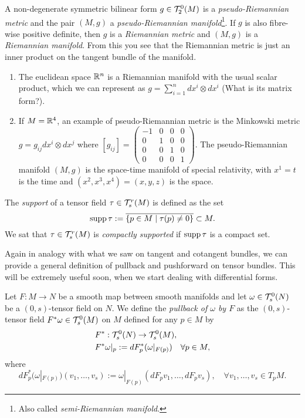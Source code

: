 \begin{example}
  A non-degenerate symmetric bilinear form $g\in \mathcal{T}_2^0(M)$ is a \emph{pseudo-Riemannian metric} and the pair $(M,g)$ a \emph{pseudo-Riemannian manifold}\footnote{Also called \emph{semi-Riemannian manifold}.}.
  If $g$ is also fibre-wise positive definite, then $g$ is a \emph{Riemannian metric} and $(M,g)$ is a \emph{Riemannian manifold}.
  From this you see that the Riemannian metric is just an inner product on the tangent bundle of the manifold.

  \begin{enumerate}
    \item The euclidean space $\mathbb{R}^n$ is a Riemannian manifold with the usual scalar product, which we can represent as $g = \sum_{i=1}^n dx^i\otimes dx^i$ (What is its matrix form?).
    \item If $M=\mathbb{R}^4$, an example of pseudo-Riemannian metric is the Minkowski metric $g = g_{ij} dx^i\otimes dx^j$ where $[g_{ij}] = {\left(\begin{smallmatrix} -1 & 0 & 0 & 0\\ 0 & 1 & 0 & 0 \\ 0 & 0 & 1 & 0 \\ 0 & 0 & 0 & 1 \end{smallmatrix}\right)}$. The pseudo-Riemannian manifold $(M, g)$ is the space-time manifold of special relativity, with $x^1 = t$ is the time and $(x^2, x^3, x^4) = (x,y,z)$ is the space.
  \end{enumerate}
\end{example}

\begin{definition}
  The \emph{support} of a tensor field $\tau\in\mathcal{T}_s^r(M)$ is defined as the set
  \begin{equation}
    \operatorname{supp} \tau := \overline{\{p\in M\mid \tau(p) \neq 0\}} \subset M.
  \end{equation}
  We sat that $\tau\in\mathcal{T}_s^r(M)$ is \emph{compactly supported} if $\operatorname{supp}\tau$ is a compact set.
\end{definition}

Again in analogy with what we saw on tangent and cotangent bundles, we can provide a general definition of pullback and pushforward on tensor bundles.
This will be extremely useful soon, when we start dealing with differential forms.

\begin{definition}
  Let $F:M\to N$ be a smooth map between smooth manifolds and let $\omega \in \mathcal{T}_s^0(N)$ be a $(0,s)$-tensor field on $N$. We define the \emph{pullback of $\omega$ by $F$} as the $(0,s)$-tensor field $F^*\omega \in \mathcal{T}_s^0(M)$ on $M$ defined for any $p\in M$ by
  \begin{align}
    &F^* : \mathcal{T}_s^0(N) \to \mathcal{T}_s^0(M),\\
    &F^*\omega|_p := dF^*_p(\omega|_{F(p)}) \quad \forall p\in M,
  \end{align}
  where
  \begin{equation}
    dF^*_p(\omega|_{F(p)})(v_1, \ldots, v_s) := \omega|_{F(p)} (dF_p v_1, \ldots, dF_p v_s), \quad\forall v_1, \ldots, v_s \in T_p M.
  \end{equation}
\end{definition}

